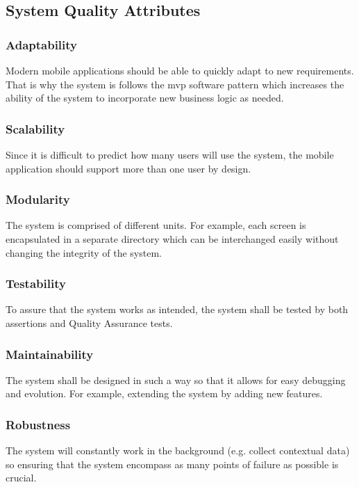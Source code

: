     \subsection{System Quality Attributes}
        
        \subsubsection{Adaptability}
        Modern mobile applications should be able to quickly adapt to new requirements. That is why the system is follows the \gls{mvp} software pattern which increases the ability of the system to incorporate new business logic as needed.
        
        \subsubsection{Scalability}
        Since it is difficult to predict how many users will use the system, the mobile application should support more than one user by design. 
        
        \subsubsection{Modularity}
        The system is comprised of different units. For example, each screen is encapsulated in a separate directory which can be interchanged easily without changing the integrity of the system.  
        
        \subsubsection{Testability}
        To assure that the system works as intended, the system shall be tested by both assertions and Quality Assurance tests. 
        
        \subsubsection{Maintainability}
        The system shall be designed in such a way so that it allows for easy debugging and evolution. For example, extending the system by adding new features.
        
        \subsubsection{Robustness}
        The system will constantly work in the background (e.g. collect contextual data) so ensuring that the system encompass as many points of failure as possible is crucial.
    
    
    